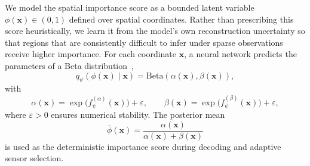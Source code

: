\documentclass[pdflatex,sn-nature]{sn-jnl}%
\begin{document}
We model the spatial importance score as a bounded latent variable \(\phi(\mathbf{x}) \in (0,1)\) defined over spatial coordinates. Rather than prescribing this score heuristically, we learn it from the model's own reconstruction uncertainty so that regions that are consistently difficult to infer under sparse observations receive higher importance.
For each coordinate \(\mathbf{x}\), a neural network predicts the parameters of a Beta distribution~\cite{NEURIPS2018_92c8c96e},
\begin{equation}
q_{\psi}\!\left(\phi(\mathbf{x}) \mid \mathbf{x}\right)
=
\mathrm{Beta}\!\left(\alpha(\mathbf{x}), \beta(\mathbf{x})\right),
\end{equation}
with
\begin{equation}
\alpha(\mathbf{x}) = \exp\!\big(f_{\psi}^{(\alpha)}(\mathbf{x})\big) + \varepsilon,
\qquad
\beta(\mathbf{x}) = \exp\!\big(f_{\psi}^{(\beta)}(\mathbf{x})\big) + \varepsilon,
\end{equation}
where \(\varepsilon>0\) ensures numerical stability. The posterior mean
\begin{equation}
\bar{\phi}(\mathbf{x}) = \frac{\alpha(\mathbf{x})}{\alpha(\mathbf{x})+\beta(\mathbf{x})}
\end{equation}
is used as the deterministic importance score during decoding and adaptive sensor selection.

\end{document}
